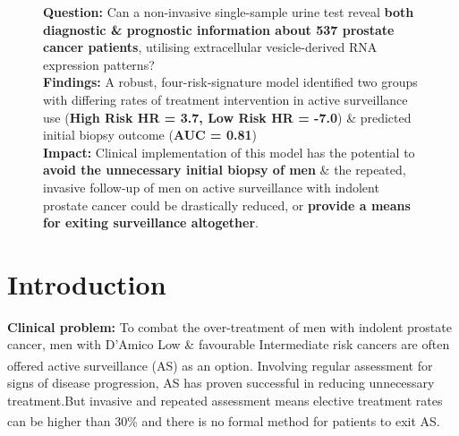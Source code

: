 \documentclass[article,30pt,extrafontsizes]{memoir}
\begin{document}
\begin{adjmulticols*}{2}{10mm}{10mm}
\normalsize{
\color{bodytextcol}
\begin{figure}
\begin{mdframed}[backgroundcolor = myframecolour,
                  font = \fontfamily{ppl}\selectfont,
                  fontcolor = white, 
                  roundcorner = 20pt, 
                  innerleftmargin = 30pt,
                  innerrightmargin = 30pt,
                  frametitle={\textbf{Quick Read}}]

\Large\textbf{Question: }\large Can a non-invasive single-sample urine test reveal \textbf{both diagnostic \& prognostic information about 537 prostate cancer patients}, utilising extracellular vesicle-derived RNA expression patterns?\bigskip\\
\Large\textbf{Findings: }\large A robust, four-risk-signature model identified two groups with differing rates of treatment intervention in active surveillance use (\textbf{High Risk HR = 3.7, Low Risk HR = -7.0}) \& predicted initial biopsy outcome (\textbf{AUC = 0.81})\bigskip\\
\Large\textbf{Impact: }\large Clinical implementation of this model has the potential to \textbf{avoid the unnecessary initial biopsy of men} \& the repeated, invasive follow-up of men on active surveillance with indolent prostate cancer could be drastically reduced, or \textbf{provide a means for exiting surveillance altogether}. 
\end{mdframed}
\end{figure}
\vspace{-45mm}

\hypertarget{introduction}{%
\section{Introduction}\label{introduction}}

\vspace{-7.5mm}

\textbf{Clinical problem:} To combat the over-treatment of men with
indolent prostate cancer, men with D'Amico Low \& favourable
Intermediate risk cancers are often offered active surveillance (AS) as
an option\textsuperscript{\cite{Selvadurai2013}}. Involving regular
assessment for signs of disease progression, AS has proven successful in
reducing unnecessary treatment.But invasive and repeated assessment
means elective treatment rates can be higher than
30\%\textsuperscript{\cite{Hamdy2016}} and there is no formal method for
patients to exit AS.

}
\end{adjmulticols*}
\end{document}
